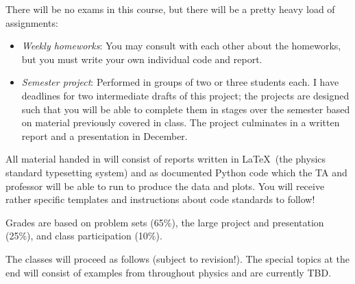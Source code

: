 \documentclass[11pt, preprint]{aastex}
\begin{document}
\noindent There will be no exams in this course, but there will be a
pretty heavy load of assignments:
\begin{itemize}
\item {\it Weekly homeworks}: You may consult with each other about
  the homeworks, but you must write your own individual code and
  report.
\item {\it Semester project}: Performed in groups of two or three
  students each. I have deadlines for two intermediate drafts of this
  project; the projects are designed such that you will be able to
  complete them in stages over the semester based on material
  previously covered in class. The project culminates in a written
  report and a presentation in December.
\end{itemize}
All material handed in will consist of reports written in \LaTeX\ (the
physics standard typesetting system) and as documented Python code
which the TA and professor will be able to run to produce the data and
plots. You will receive rather specific templates and instructions
about code standards to follow!

\noindent Grades are based on problem sets (65\%), the large project
and presentation (25\%), and class participation (10\%).

\noindent The classes will proceed as follows (subject to
revision!). The special topics at the end will consist of examples
from throughout physics and are currently TBD.
\end{document}
